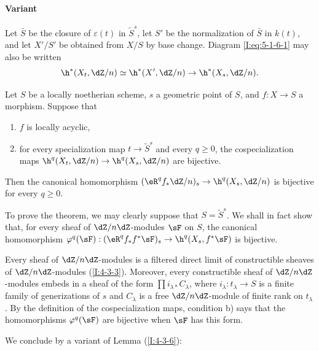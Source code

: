 \paragraph{Variant}
Let $\bar S$ be the closure of $\varepsilon(t)$ in
$\widetilde S^s$, let $S'$ be the normalization of $\bar S$ in $k(t)$,
and let $X'/S'$ be obtained from $X/S$ by base change. Diagram
\eqref{I:eq:5-1-6-1} may also be written
\[
  \h^*(X_t,\dZ/n) \simeq \h^*(X',\dZ/n) \to \h^*(X_s,\dZ/n) \text{.}
\]

\begin{theorem}\label{I:5-1-7}
Let $S$ be a locally noetherian scheme, $s$ a geometric point of $S$,
and $f:X\to S$ a morphism. Suppose that
\begin{enumerate}[\indent a)]
  \item $f$ is locally acyclic,
  \item for every specialization map $t\to\widetilde S^s$ and every
    $q\geqslant0$, the cospecialization maps
    $\h^q(X_t,\dZ/n)\to\h^q(X_s,\dZ/n)$ are bijective.
\end{enumerate}
Then the canonical homomorphism
$(\eR^qf_*\dZ/n)_s\to\h^q(X_s,\dZ/n)$ is bijective for every
$q\geqslant0$.
\end{theorem}

To prove the theorem, we may clearly suppose that
$S=\widetilde S^s$. We shall in fact show that, for every sheaf of
$\dZ/n\dZ$-modules $\sF$ on $S$, the canonical homomorphism
$\varphi^q(\sF):(\eR^qf_*f^*\sF)_s\to\h^q(X_s,f^*\sF)$ is bijective.

Every sheaf of $\dZ/n\dZ$-modules is a filtered direct limit of
constructible sheaves of $\dZ/n\dZ$-modules (\ref{I:4-3-3}). Moreover,
every constructible sheaf of $\dZ/n\dZ$-modules embeds in a sheaf of the
form $\prod i_{\lambda *}C_\lambda$, where
$i_\lambda:t_\lambda\to S$ is a finite family of generizations of $s$
and $C_\lambda$ is a free $\dZ/n\dZ$-module of finite rank on
$t_\lambda$. By the definition of the cospecialization maps, condition
b) says that the homomorphisms $\varphi^q(\sF)$ are bijective when
$\sF$ has this form.

We conclude by a variant of Lemma (\ref{I:4-3-6}):

